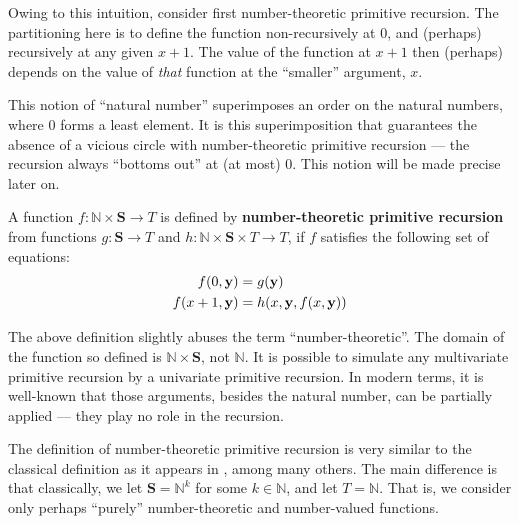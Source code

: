 
Owing to this intuition, consider first number-theoretic primitive recursion.
The partitioning here is to define the function non-recursively at $0$, and
(perhaps) recursively at any given $x+1$. The value of the function at $x+1$
then (perhaps) depends on the value of \emph{that} function at the ``smaller''
argument, $x$.

This notion of ``natural number'' superimposes an order on the natural numbers,
where $0$ forms a least element. It is this superimposition that guarantees the
absence of a vicious circle with number-theoretic primitive recursion --- the
recursion always ``bottoms out'' at (at most) $0$. This notion will be made
precise later on.

\begin{definition} A function $f : \mathbb{N} \times \mathbf{S} \rightarrow T$
is defined by \textbf{number-theoretic primitive recursion} from functions $g :
\mathbf{S} \rightarrow T$ and $h : \mathbb{N} \times \mathbf{S} \times T
\rightarrow T$, if $f$ satisfies the following set of equations:\begin{align*}
%
f\p{0, \mathbf{y}} &= g\p{\mathbf{y}}\\
%
f\p{x+1, \mathbf{y}} &= h\p{x,\mathbf{y},f\p{x,\mathbf{y}}}
%
\end{align*}\end{definition}

\begin{remark} The above definition slightly abuses the term
``number-theoretic''. The domain of the function so defined is $\mathbb{N}
\times \mathbf{S}$, not $\mathbb{N}$. It is possible to simulate any
multivariate primitive recursion by a univariate primitive
recursion\cite{rose-1984}.  In modern terms, it is well-known that those
arguments, besides the natural number, can be partially applied --- they play
no role in the recursion.  \end{remark}

\begin{remark} The definition of number-theoretic primitive recursion is very
similar to the classical definition as it appears in \cite{dedekind-1888,
goedel-1944, rose-1984, odifreddi-1989}, among many others. The main difference
is that classically, we let $\mathbf{S}=\mathbb{N}^k$ for some $k \in
\mathbb{N}$, and let $T = \mathbb{N}$. That is, we consider only perhaps
``purely'' number-theoretic and number-valued functions. \end{remark}

